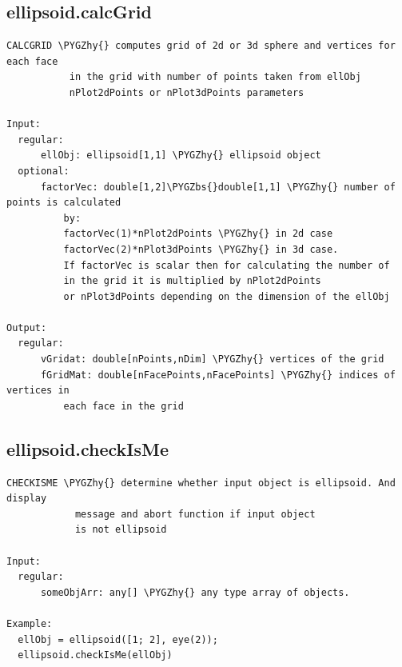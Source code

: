 \documentclass[letterpaper,10pt,english]{sphinxmanual}
\def\PYGZbs{\char`\\}
\def\PYGZhy{\char`\-}
\begin{document}
\subsection{ellipsoid.calcGrid}
\label{chap_functions:ellipsoid-calcgrid}
\begin{Verbatim}[commandchars=\\\{\}]
CALCGRID \PYGZhy{} computes grid of 2d or 3d sphere and vertices for each face
           in the grid with number of points taken from ellObj
           nPlot2dPoints or nPlot3dPoints parameters

Input:
  regular:
      ellObj: ellipsoid[1,1] \PYGZhy{} ellipsoid object
  optional:
      factorVec: double[1,2]\PYGZbs{}double[1,1] \PYGZhy{} number of points is calculated
          by:
          factorVec(1)*nPlot2dPoints \PYGZhy{} in 2d case
          factorVec(2)*nPlot3dPoints \PYGZhy{} in 3d case.
          If factorVec is scalar then for calculating the number of
          in the grid it is multiplied by nPlot2dPoints
          or nPlot3dPoints depending on the dimension of the ellObj

Output:
  regular:
      vGridat: double[nPoints,nDim] \PYGZhy{} vertices of the grid
      fGridMat: double[nFacePoints,nFacePoints] \PYGZhy{} indices of vertices in
          each face in the grid
\end{Verbatim}


\subsection{ellipsoid.checkIsMe}
\label{chap_functions:ellipsoid-checkisme}
\begin{Verbatim}[commandchars=\\\{\}]
CHECKISME \PYGZhy{} determine whether input object is ellipsoid. And display
            message and abort function if input object
            is not ellipsoid

Input:
  regular:
      someObjArr: any[] \PYGZhy{} any type array of objects.

Example:
  ellObj = ellipsoid([1; 2], eye(2));
  ellipsoid.checkIsMe(ellObj)
\end{Verbatim}
\end{document}
